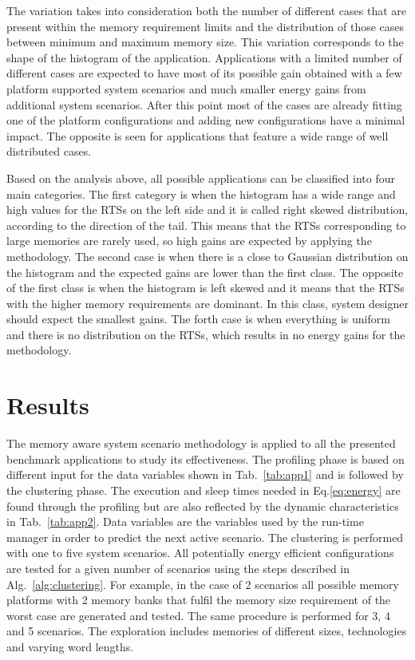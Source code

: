 \documentclass[smallextended]{svjour3}
\begin{document}
The variation takes into consideration both the number of different cases that are present within the memory requirement limits and the distribution of those cases between minimum and maximum memory size. 
This variation corresponds to the shape of the histogram of the application.
Applications with a limited number of different cases are expected to have most of its possible gain obtained with a few platform supported system scenarios and much smaller energy gains from additional system scenarios. 
After this point most of the cases are already fitting one of the platform configurations and adding new configurations have a minimal impact. 
The opposite is seen for applications that feature a wide range of well distributed cases.

Based on the analysis above, all possible applications can be classified into four main categories. 
The first category is when the histogram has a wide range and high values for the RTSs on the left side and it is called right skewed distribution, according to the direction of the tail.
This means that the RTSs corresponding to large memories are rarely used, so high gains are expected by applying the methodology.
The second case is when there is a close to Gaussian distribution on the histogram and the expected gains are lower than the first class.
The opposite of the first class is when the histogram is left skewed and it means that the RTSs with the higher memory requirements are dominant.
In this class, system designer should expect the smallest gains.
The forth case is when everything is uniform and there is no distribution on the RTSs, which results in no energy gains for the methodology.

\section{Results}
\label{sec:results}

The memory aware system scenario methodology is applied to all the presented benchmark applications to study its effectiveness. 
The profiling phase is based on different input for the data variables shown in Tab.~\ref{tab:app1} and is followed by the clustering phase. 
The execution and sleep times needed in Eq.\ref{eq:energy} are found through the profiling but are also reflected by the dynamic characteristics in Tab.~\ref{tab:app2}. 
Data variables are the variables used by the run-time manager in order to predict the next active scenario. 
The clustering is performed with one to five system scenarios. 
All potentially energy efficient configurations are tested for a given number of scenarios using the steps described in Alg.~\ref{alg:clustering}. 
For example, in the case of 2 scenarios all possible memory platforms with 2 memory banks that fulfil the memory size requirement of the worst case are generated and tested. 
The same procedure is performed for 3, 4 and 5 scenarios. 
The exploration includes memories of different sizes, technologies and varying word lengths. 
\end{document}
